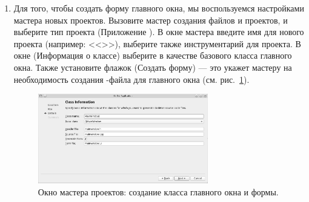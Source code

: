 \begin{enumerate}
\item Для того, чтобы создать форму главного окна, мы воспользуемся настройками мастера новых проектов. Вызовите мастер
создания файлов и проектов, и выберите тип проекта  (Приложение ). 
В окне мастера
введите имя для нового проекта (например: <<>>), выберите также
инструментарий для проекта. В окне  (Информация о классе) выберите
 в качестве базового класса главного окна. Также установите флажок 
(Создать форму) --- это укажет мастеру на необходимость
создания -файла для главного окна (см. рис.~\ref{ch15:refDrawing0}).

\begin{figure}[htb]
\begin{center}
\includegraphics[width=0.7\textwidth]{img/ris_15_1}
\caption[Окно мастера проектов: создание класса главного окна и формы.]{Окно мастера проектов: создание класса
главного окна и формы.}
\label{ch15:refDrawing0}
\end{center}
\end{figure}


\end{enumerate}
